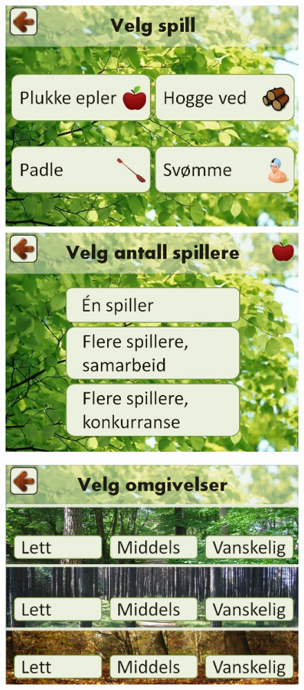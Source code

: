 \begin{figure} [H]
\centering
\includegraphics[scale=0.5]{IconEple.jpg}
\label{fig:iconEpleNorsk}
\end{figure} 

\begin{figure} [H]
\centering
\includegraphics[scale=0.45]{VelgOmgivelser.jpg}
\label{fig:omgivelseNivaaNorsk}
\end{figure}

